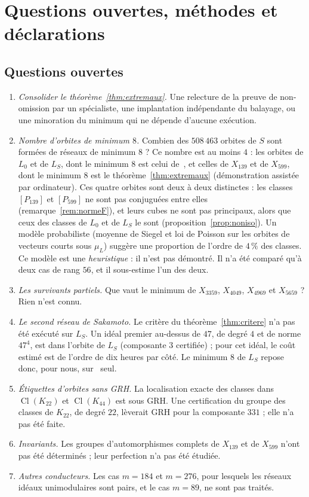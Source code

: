 \documentclass[11pt,a4paper]{amsart}
\theoremstyle{plain}
\theoremstyle{definition}
\numberwithin{equation}{section}
\DeclareMathOperator{\Cl}{Cl}
\newcommand{\Lz}{L_{0}}
\newcommand{\LS}{L_{S}}
\begin{document}
\section{Questions ouvertes, méthodes et déclarations}\label{sec:fin}

\subsection{Questions ouvertes}\label{subsec:questions}

\begin{enumerate}[label=\textup{(Q\arabic*)}]
\item \emph{Consolider le théorème~\ref{thm:extremaux}.} Une relecture de la preuve de non-omission par un spécialiste, une implantation indépendante du balayage, ou une minoration du minimum qui ne dépende d'aucune exécution.
\item \emph{Nombre d'orbites de minimum $8$.} Combien des $508\,463$ orbites de $S$ sont formées de réseaux de minimum $8$ ? Ce nombre est au moins $4$ : les orbites de $\Lz$ et de $\LS$, dont le minimum $8$ est celui de~\cite{Sak26}, et celles de $X_{139}$ et de $X_{599}$, dont le minimum $8$ est le théorème~\ref{thm:extremaux} (démonstration assistée par ordinateur). Ces quatre orbites sont deux à deux distinctes : les classes $[P_{139}]$ et $[P_{599}]$ ne sont pas conjuguées entre elles (remarque~\ref{rem:normeF}), et leurs cubes ne sont pas principaux, alors que ceux des classes de $\Lz$ et de $\LS$ le sont (proposition~\ref{prop:noniso}). Un modèle probabiliste (moyenne de Siegel et loi de Poisson sur les orbites de vecteurs courts sous $\mu_L$) suggère une proportion de l'ordre de $4\,\%$ des classes. Ce modèle est une \emph{heuristique} : il n'est pas démontré. Il n'a été comparé qu'à deux cas de rang $56$, et il sous-estime l'un des deux.
\item \emph{Les survivants partiels.} Que vaut le minimum de $X_{3359}$, $X_{4049}$, $X_{4969}$ et $X_{5659}$ ? Rien n'est connu.
\item \emph{Le second réseau de Sakamoto.} Le critère du théorème~\ref{thm:critere} n'a pas été exécuté sur $\LS$. Un idéal premier au-dessus de $47$, de degré $4$ et de norme $47^4$, est dans l'orbite de $\LS$ (composante $3$ certifiée) ; pour cet idéal, le coût estimé est de l'ordre de dix heures par côté. Le minimum $8$ de $\LS$ repose donc, pour nous, sur~\cite{Sak26} seul.
\item \emph{Étiquettes d'orbites sans GRH.} La localisation exacte des classes dans $\Cl(K_{22})$ et $\Cl(K_{44})$ est sous GRH. Une certification du groupe des classes de $K_{22}$, de degré $22$, lèverait GRH pour la composante $331$ ; elle n'a pas été faite.
\item \emph{Invariants.} Les groupes d'automorphismes complets de
$X_{139}$ et de $X_{599}$ n'ont pas été déterminés ;
leur perfection n'a pas été étudiée.
\item \emph{Autres conducteurs.} Les cas $m=184$ et $m=276$, pour lesquels les réseaux idéaux unimodulaires sont pairs, et le cas $m=89$, ne sont pas traités.
\end{enumerate}
\end{document}
